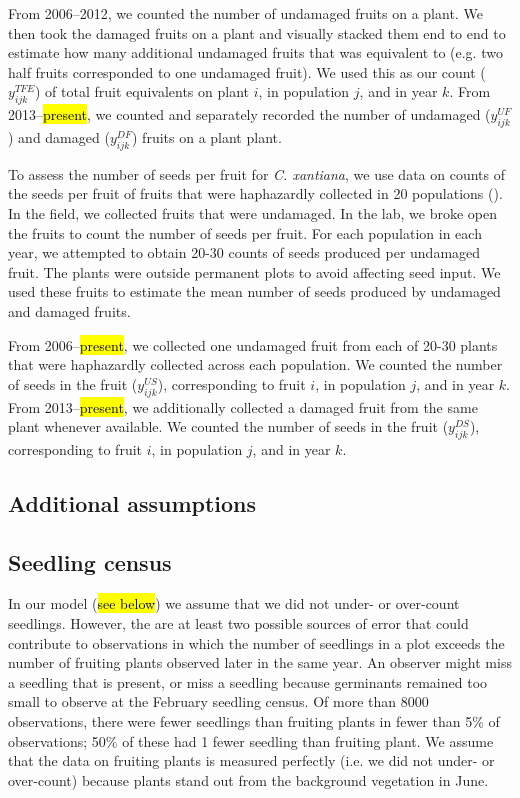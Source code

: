 \documentclass[12pt, oneside, titlepage]{article}   	%
\begin{document}
From 2006--2012, we counted the number of undamaged fruits on a plant. We then took the damaged fruits on a plant and visually stacked them end to end to estimate how many additional undamaged fruits that was equivalent to (e.g. two half fruits corresponded to one undamaged fruit). We used this as our count ($y^{TFE}_{ijk}$) of total fruit equivalents on plant $i$, in population $j$, and in year $k$. From 2013--\hl{present}, we counted and separately recorded the number of undamaged ($y^{UF}_{ijk}$) and damaged ($y^{DF}_{ijk}$) fruits on a plant plant. 

To assess the number of seeds per fruit for \textit{C. xantiana}, we use data on counts of the seeds per fruit of fruits that were haphazardly collected in 20 populations (\cite{eckhart2011}). In the field, we collected fruits that were undamaged. In the lab, we broke open the fruits to count the number of seeds per fruit. For each population in each year, we attempted to obtain 20-30 counts of seeds produced per undamaged fruit. The plants were outside permanent plots to avoid affecting seed input. We used these fruits to estimate the mean number of seeds produced by undamaged and damaged fruits.

From 2006--\hl{present}, we collected one undamaged fruit from each of 20-30 plants that were haphazardly collected across each population. We counted the number of seeds in the fruit ($y^{US}_{ijk}$), corresponding to fruit $i$, in population $j$, and in year $k$. From 2013--\hl{present}, we additionally collected a damaged fruit from the same plant whenever available. We counted the number of seeds in the fruit ($y^{DS}_{ijk}$), corresponding to fruit $i$, in population $j$, and in year $k$. 

\subsection{Additional assumptions}
 
 \subsection{Seedling census}
In our model (\hl{see below}) we assume that we did not under- or over-count seedlings. However, the are at least two possible sources of error that could contribute to observations in which the number of seedlings in a plot exceeds the number of fruiting plants observed later in the same year. An observer might miss a seedling that is present, or miss a seedling because germinants remained too small to observe at the February seedling census.  Of more than 8000 observations, there were fewer seedlings than fruiting plants in fewer than 5\% of observations; 50\% of these had 1 fewer seedling than fruiting plant. We assume that the data on fruiting plants is measured perfectly (i.e. we did not under- or over-count) because plants stand out from the background vegetation in June. 
\end{document}
